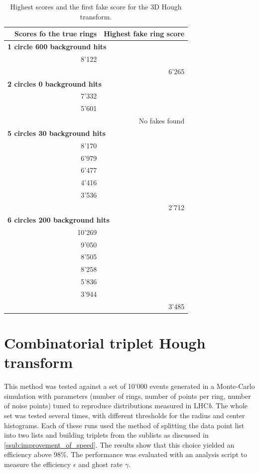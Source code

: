 \documentclass[11pt]{scrreprt}
\begin{document}
\begin{table}[tbp]
  \caption[3D Hough transform scores]{Highest scores and the first fake score for the 3D Hough transform.}
  \label{tab:3d_scores}
  \centering

  \begin{tabular}{p{5cm}rr}
  \toprule
   & \textbf{Scores fo the true rings}  & \textbf{Highest fake ring score}\\
  \midrule
  \midrule
  \multicolumn{3}{l}{\textbf{1 circle 600 background hits}} \\
  & 8'122 \\
   &  & 6'265\\
  \midrule
  \multicolumn{3}{l}{\textbf{2 circles 0 background hits}}\\
   & 7'332 \\
   & 5'601 \\
   \multicolumn{3}{r}{No fakes found}\\
  \midrule
  \multicolumn{3}{l}{\textbf{5 circles 30 background hits}}\\
  & 8'170 \\
  & 6'979 \\
  & 6'477 \\
  & 4'416 \\
  & 3'536 \\
   &  & 2'712 \\
  \midrule
  \multicolumn{3}{l}{\textbf{6 circles 200 background hits}}\\
  & 10'269 \\
  & 9'050 \\
  & 8'505 \\
  & 8'258 \\
  & 5'836 \\
  & 3'944 \\
   & & 3'485 \\
   \bottomrule
  \end{tabular}
\end{table}



\clearpage
\section{Combinatorial triplet Hough transform} %
\label{sec:combinatorial_approach_results}

This method was tested against a set of 10'000 events generated in a Monte-Carlo simulation with parameters (number of rings, number of points per ring, number of noise points) tuned to reproduce distributions measured in LHC\textit{b}. The whole set was tested several times, with different thresholds for the radius and center histograms. 
Each of these runs used the method of splitting the data point list into two lists and building triplets from 
the sublists as discussed in \ref{ssub:improvement_of_speed}. The results show that this choice yielded an efficiency above $98\%$. 
The performance was evaluated with an analysis script to measure the efficiency $\epsilon$ and ghost rate $\gamma$.
\end{document}
